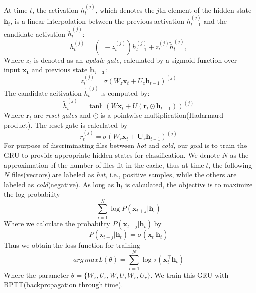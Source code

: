 \documentclass[conference]{IEEEtran}
\begin{document}
At time $t$, the activation $h_t^{(j)}$, which denotes the $j$th element of the hidden state $\mathbf{h}_t$, is a linear interpolation between the previous activation $h_{t-1}^{(j)}$ and the candidate activation $\tilde{h}_t^{(j)}$:
\begin{equation}
    h_t^{(j)} = (1-z_t^{(j)}) h_{t-1}^{(j)} + z_t^{(j)}\tilde{h}_t^{(j)},
\end{equation}
Where $z_t$ is denoted as an \textit{update gate}, calculated by a sigmoid function over input $\mathbf{x_t}$ and previous state $\mathbf{h_{t-1}}$:
\begin{equation}
z_t^{(j)} = \sigma(W_z \mathbf{x}_t + U_z \mathbf{h}_{t-1})^{(j)}
\end{equation}
The candidate acitivation $\tilde{h}_t^{(j)}$ is computed by:
\begin{equation}
    \tilde{h}_t^{(j)} = \tanh(W \mathbf{x}_t + U (\mathbf{r}_t \odot \mathbf{h}_{t-1}))^{(j)}
\end{equation}
Where $\mathbf{r}_t$ are \textit{reset gates} and $\odot$ is a pointwise multiplication(Hadarmard product).
The reset gate is calculated by
\begin{equation}
    r_t^{(j)} = \sigma(W_r \mathbf{x}_t + \mathbf{U}_r \mathbf{h}_{t-1})^{(j)}
\end{equation}
For purpose of discriminating files between \textit{hot} and \textit{cold}, 
our goal is to train the GRU to provide appropriate hidden states for classification. 
We denote $N$ as the approximation of the number of files fit in the cache,
thus at time $t$, the following $N$ files(vectors) are labeled as \textit{hot}, i.e., positive samples, 
while the others are labeled as \textit{cold}(negative).
As long as $\mathbf{h}_t$ is calculated, the objective is to maximize the log probability
\begin{equation}
    \label{eq.obj}
    \sum_{i=1}^N \log P(\mathbf{x}_{t+j}|\mathbf{h}_t)
\end{equation}
Where we calculate the probability $P(\mathbf{x}_{t+j}|\mathbf{h}_t)$ by
\begin{equation}
    P(\mathbf{x}_{t+j}|\mathbf{h}_t) = \sigma(\mathbf{x}^\top_t \mathbf{h}_t)
\end{equation}
Thus we obtain the loss function for training
\begin{equation}
    arg\,max L(\theta) = \sum_{i=1}^N \log \sigma(\mathbf{x}^\top_t \mathbf{h}_t)
\end{equation}
Where the parameter $\theta = \{W_z, U_z, W, U, W_r, U_r\}$.
We train this GRU with BPTT(backpropagation through time).
\end{document}
